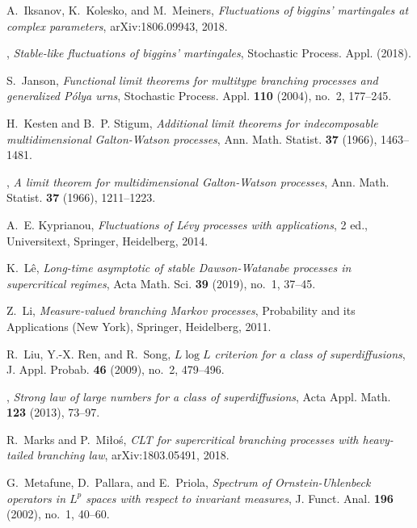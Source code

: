 \documentclass[12pt,a4paper]{amsart}
\theoremstyle{plain}
\theoremstyle{definition}
\numberwithin{equation}{section}
\begin{document}
\begin{thebibliography}{10}
A.~Iksanov, K.~Kolesko, and M.~Meiners, \emph{Fluctuations of biggins'
  martingales at complex parameters}, arXiv:1806.09943, 2018.

\bysame, \emph{Stable-like fluctuations of biggins' martingales}, Stochastic
  Process. Appl. (2018).

S.~Janson, \emph{Functional limit theorems for multitype branching processes
  and generalized {P}\'{o}lya urns}, Stochastic Process. Appl. \textbf{110}
  (2004), no.~2, 177--245.

H.~Kesten and B.~P. Stigum, \emph{Additional limit theorems for indecomposable
  multidimensional {G}alton-{W}atson processes}, Ann. Math. Statist.
  \textbf{37} (1966), 1463--1481.

\bysame, \emph{A limit theorem for multidimensional {G}alton-{W}atson
  processes}, Ann. Math. Statist. \textbf{37} (1966), 1211--1223.

A.~E. Kyprianou, \emph{Fluctuations of {L}\'{e}vy processes with applications},
  2 ed., Universitext, Springer, Heidelberg, 2014.

K.~L\^{e}, \emph{Long-time asymptotic of stable {D}awson-{W}atanabe processes
  in supercritical regimes}, Acta Math. Sci. \textbf{39} (2019), no.~1, 37--45.

Z.~Li, \emph{Measure-valued branching {M}arkov processes}, Probability and its
  Applications (New York), Springer, Heidelberg, 2011.

R.~Liu, Y.-X. Ren, and R.~Song, \emph{{$L\log L$} criterion for a class of
  superdiffusions}, J. Appl. Probab. \textbf{46} (2009), no.~2, 479--496.

\bysame, \emph{Strong law of large numbers for a
  class of superdiffusions}, Acta Appl. Math. \textbf{123} (2013), 73--97.

R.~Marks and P.~Mi{\l}o{\'s}, \emph{C{LT} for supercritical branching processes
  with heavy-tailed branching law}, arXiv:1803.05491, 2018.

G.~Metafune, D.~Pallara, and E.~Priola, \emph{Spectrum of
  {O}rnstein-{U}hlenbeck operators in {$L^p$} spaces with respect to invariant
  measures}, J. Funct. Anal. \textbf{196} (2002), no.~1, 40--60.


\end{thebibliography}
\end{document}
